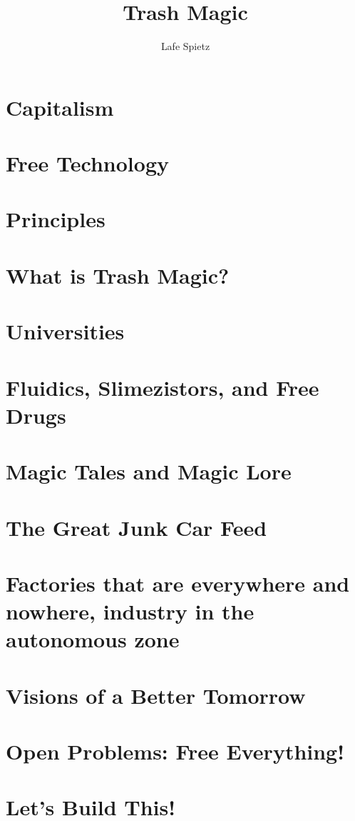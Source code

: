 \documentclass[ebook,12pt,openany]{memoir} %
\title{Trash Magic}
\author{Lafe Spietz}
\begin{document}
\maketitle

\chapter{Capitalism}


\chapter{Free Technology}


\chapter{Principles}


\chapter{What is Trash Magic?}


\chapter{Universities}


\chapter{Fluidics, Slimezistors, and Free Drugs}


\chapter{Magic Tales and Magic Lore}


\chapter{The Great Junk Car Feed}


\chapter{Factories that are everywhere and nowhere, industry in the autonomous zone}


\chapter{Visions of a Better Tomorrow}


\chapter{Open Problems: Free Everything!}


\chapter{Let's Build This!}

\end{document}
